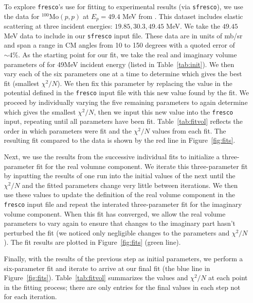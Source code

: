 \documentclass[]{scrartcl}
\begin{document}
To explore \texttt{fresco}'s use for fitting to experimental results (via \texttt{sfresco}), we use the data for $ ^{100} \mathrm{Mo} (p,p)$ at $E_p = 49.4$ MeV from \citep{Sinha1972}. This dataset includes  elastic scattering at three incident energies: $19.85,30.3,49.45$ MeV. We take the $49.45$ MeV data to include in our \texttt{sfresco} input file. These data are in units of mb/sr and span a range in CM angles from 10 to 150 degrees with a quoted error of $\sim 4 \%$. As the starting point for our fit, we take the real and imaginary volume parameters of \citep{Menet1971} for 49MeV incident energy (listed in Table~\ref{tab:init}). We then vary each of the six parameters one at a time to determine which gives the best fit (smallest $\chi ^2 / N$). We then fix this parameter by replacing the value in the potential defined in the \texttt{fresco} input file with this new value found by the fit. We proceed by individually varying the five remaining parameters to again determine which gives the smallest $\chi ^2 / N$, then we input this new value into the \texttt{fresco} input, repeating until all parameters have been fit. Table~\ref{tab:fitvol} reflects the order in which parameters were fit and the $\chi ^2 / N$ values from each fit. The resulting fit compared to the data is shown by the red line in Figure~\ref{fig:fits}.

Next, we use the results from the successive individual fits to initialize a three-parameter fit for the real volumne component. We iterate this three-parameter fit by inputting the results of one run into the initial values of the next until the $\chi ^2 /N$ and the fitted parameters change very little between iterations. We then use these values to update the definition of the real volume component in the \texttt{fresco} input file and repeat the interated three-parameter fit for the imaginary volume component. When this fit has converged, we allow the real volume parameters to vary again to ensure that changes to the imaginary part hasn't perturbed the fit (we noticed only negligible changes to the parameters and $\chi ^2 /N$). The fit results are plotted in Figure~\ref{fig:fits} (green line).

Finally, with the results of the previous step as initial parameters, we perform a six-parameter fit and iterate to arrive at our final fit (the blue line in Figure~\ref{fig:fits}). Table~\ref{tab:fitvol} summarizes the values and $\chi ^2 / N$ at each point in the fitting process; there are only entries for the final values in each step not for each iteration.
\end{document}

